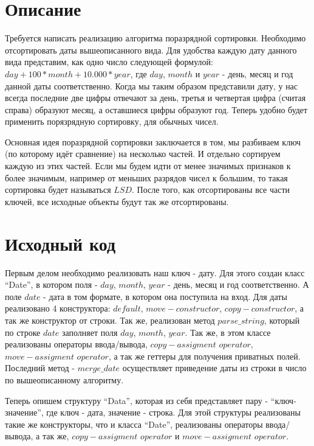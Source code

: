 \section{Описание}
Требуется написать реализацию алгоритма поразрядной сортировки. Необходимо отсортировать даты вышеописанного вида. Для удобства каждую дату данного вида представим, как одно число следующей формулой: $day + 100 * month + 10.000 * year$, где $day$, $month$ и $year$ - день, месяц и год данной даты соответственно. Когда мы таким образом представили дату, у нас всегда последние две цифры отвечают за день, третья и четвертая цифра (считая справа) образуют месяц, а оставшиеся цифры образуют год. Теперь удобно будет применить порязрядную сортировку, для обычных чисел.

Основная идея поразрядной сортировки заключается в том, мы разбиваем ключ (по которому идёт сравнение) на несколько частей. И отдельно сортируем каждую из этих частей. Если мы будем идти от менее значимых признаков к более значимым, например от меньших разрядов чисел к большим, то такая сортировка будет называться $LSD$. После того, как отсортированы все части ключей, все исходные объекты будут так же отсортированы.

\pagebreak

\section{Исходный код}
Первым делом необходимо реализовать наш ключ - дату. Для этого создан класс \enquote{Date}, в котором поля - $day$, $month$, $year$ - день, месяц и год соответственно. А поле $date$ - дата в том формате, в котором она поступила на вход. Для даты реализовано 4 конструктора: $default$, $move-constructor$, $copy-constructor$, а так же конструктор от строки. Так же, реализован метод $parse\_string$, который по строке $date$ заполняет поля $day$, $month$, $year$. Так же, в этом классе реализованы операторы ввода/вывода, $copy-assigment$ $operator$, $move-assigment$ $operator$, а так же геттеры для получения приватных полей. Последний метод - $merge\_date$ осуществляет приведение даты из строки в число по вышеописанному алгоритму.

Теперь опишем структуру \enquote{Data}, которая из себя представляет пару - \enquote{ключ-значение}, где ключ - дата, значение - строка. Для этой структуры реализованы такие же конструкторы, что и класса \enquote{Date}, реализованы операторы ввода/вывода, а так же, $copy-assigment$ $operator$ и $move-assigment$ $operator$.


